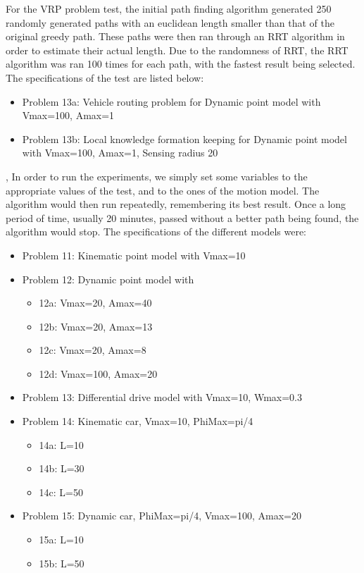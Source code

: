 \documentclass[a4paper,12pt]{article}
\begin{document}
For the VRP problem test, the initial path finding algorithm generated 250 randomly generated paths with an euclidean length smaller than that of the original greedy path. These paths were then ran through an RRT algorithm in order to estimate their actual length. Due to the randomness of RRT, the RRT algorithm was ran 100 times for each path, with the fastest result being selected. The specifications of the test are listed below:
\begin{itemize}
\item Problem 13a: Vehicle routing problem for Dynamic point model with Vmax=100, Amax=1
\item Problem 13b: Local knowledge formation keeping for Dynamic point model with Vmax=100, Amax=1, Sensing radius 20
\end{itemize}
, In order to run the experiments, we simply set some variables to the appropriate values of the test, and  to the ones of the motion model. The algorithm would then run repeatedly, remembering its best result. Once a long period of time, usually 20 minutes, passed without a better path being found, the algorithm would stop.
The specifications of the different models were:
\begin{itemize}
\item Problem 11: Kinematic point model with Vmax=10
\item Problem 12: Dynamic point model with 
	\begin{itemize}
	\item 12a: Vmax=20, Amax=40
	\item 12b: Vmax=20, Amax=13
	\item 12c: Vmax=20, Amax=8
	\item 12d: Vmax=100, Amax=20
	\end{itemize}
\item Problem 13: Differential drive model with Vmax=10, Wmax=0.3
\item Problem 14: Kinematic car, Vmax=10, PhiMax=pi/4
	\begin{itemize}
	\item 14a: L=10
	\item 14b: L=30
	\item 14c: L=50
	\end{itemize}
\item Problem 15: Dynamic car, PhiMax=pi/4, Vmax=100, Amax=20
	\begin{itemize}
	\item 15a: L=10
	\item 15b: L=50
	\end{itemize}
\end{itemize}
\end{document}
